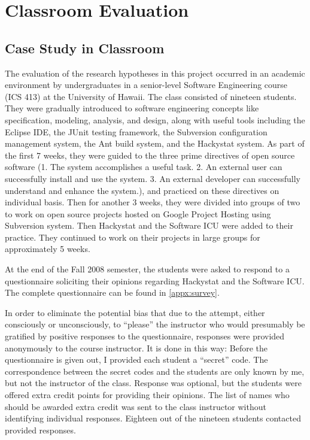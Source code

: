 \chapter{Classroom Evaluation}

\section{Case Study in Classroom}
The evaluation of the research hypotheses in this project occurred in an academic environment by undergraduates in a senior-level Software Engineering course (ICS 413) at the University of Hawaii. The class consisted of nineteen students. They were gradually introduced to software engineering concepts like specification, modeling, analysis, and design, along with useful tools including the Eclipse IDE, the JUnit testing framework, the Subversion configuration management system, the Ant build system, and the Hackystat system. As part of the first 7 weeks, they were guided to the three prime directives of open source software (1. The system accomplishes a useful task. 2. An external user can successfully install and use the system. 3. An external developer can successfully understand and enhance the system.), and practiced on these directives on individual basis. Then for another 3 weeks, they were divided into groups of two to work on open source projects hosted on Google Project Hosting using Subversion system. Then Hackystat and the Software ICU were added to their practice. They continued to work on their projects in large groups for approximately 5 weeks.

At the end of the Fall 2008 semester, the students were asked to respond to a questionnaire soliciting their opinions regarding Hackystat and the Software ICU. The complete questionnaire can be found in \autoref{appx:survey}. 

In order to eliminate the potential bias that due to the attempt, either consciously or unconsciously, to ``please'' the instructor who would presumably be gratified by positive responses to the questionnaire, responses were provided anonymously to the course instructor. It is done in this way: Before the questionnaire is given out, I provided each student a ``secret'' code. The correspondence between the secret codes and the students are only known by me, but not the instructor of the class. Response was optional, but the students were offered extra credit points for providing their opinions. The list of names who should be awarded extra credit was sent to the class instructor without identifying individual responses. Eighteen out of the nineteen students contacted provided responses. 

